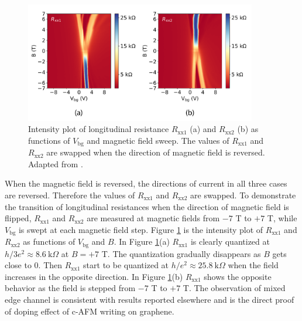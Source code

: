 \documentclass[pdflatex, sectionletters, 12pt]{pittetd}    %
\begin{document}
\begin{figure}[h!]
	\centering
	\includegraphics[width=0.90\textwidth]{Drawing/MixingIntensityPlot.pdf}
	\caption{Intensity plot of longitudinal resistance $R_\mathrm{xx1}$ (a) and $R_\mathrm{xx2}$ (b) as functions of $V_\mathrm{bg}$ and magnetic field sweep. The values of $R_\mathrm{xx1}$ and $R_\mathrm{xx2}$ are swapped when the direction of magnetic field is reversed. Adapted from \cite{li2019reconfigurable}.}
	\label{FIG:MixingIntensityPlot}
\end{figure}

When the magnetic field is reversed, the directions of current in all three cases are reversed. Therefore the values of $R_\mathrm{xx1}$ and $R_\mathrm{xx2}$ are swapped. To demonstrate the transition of longitudinal resistances when the direction of magnetic field is flipped, $R_\mathrm{xx1}$ and $R_\mathrm{xx2}$ are measured at magnetic fields from $-7$ T to $+7$ T, while $V_\mathrm{bg}$ is swept at each magnetic field step. Figure \ref{FIG:MixingIntensityPlot} is the intensity plot of $R_\mathrm{xx1}$ and $R_\mathrm{xx2}$ as functions of $V_\mathrm{bg}$ and $B$. In Figure \ref{FIG:MixingIntensityPlot}(a) $R_\mathrm{xx1}$ is clearly quantized at $h/3e^2 \approx 8.6 \ \mathrm{k}\Omega$ at $B = +7$ T. The quantization gradually disappears as $B$ gets close to 0. Then $R_\mathrm{xx1}$ start to be quantized at $h/e^2 \approx 25.8 \ \mathrm{k}\Omega$ when the field increases in the opposite direction. In Figure \ref{FIG:MixingIntensityPlot}(b) $R_\mathrm{xx1}$ shows the opposite behavior as the field is stepped from $-7$ T to $+7$ T. The observation of mixed edge channel is consistent with results reported elsewhere\cite{williams2007quantum, lohmann2009four, amet2014selective, abanin2007quantized, ki2010dependence, klimov2015edge, woszczyna2011graphene, ozyilmaz2007electronic, schmidt2013mixing} and is the direct proof of doping effect of c-AFM writing on graphene.
\end{document}
